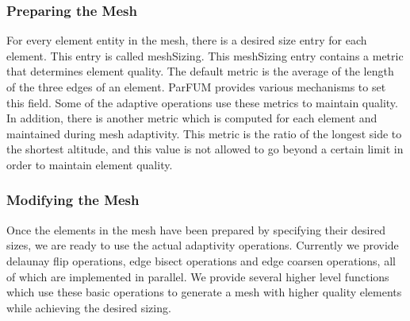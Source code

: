 \subsubsection{Preparing the Mesh}
For every element entity in the mesh, there is a desired size entry 
for each element. This entry is called meshSizing. This meshSizing entry 
contains a metric that determines element quality. The default metric is
the average of the length of the three edges of an element. ParFUM provides 
various mechanisms to set this field. Some of the adaptive operations
use these metrics to maintain quality. In addition, there is another metric
which is computed for each element and maintained during mesh adaptivity. This metric 
is the ratio of the longest side to the shortest altitude, and this value 
is not allowed to go beyond a certain limit in order to maintain element quality.






\subsubsection{Modifying the Mesh}
Once the elements in the mesh have been prepared by specifying their desired
sizes, we are ready to use the actual adaptivity operations. Currently we
provide delaunay flip operations, edge bisect operations and edge coarsen 
operations, all of which are implemented in parallel. We provide several higher level 
functions which use these basic operations to 
generate a mesh with higher quality elements while achieving the
desired sizing.

